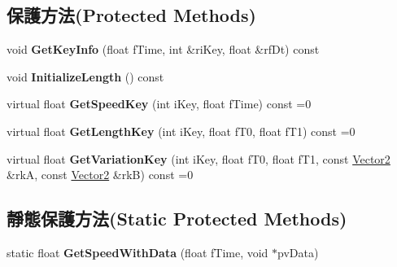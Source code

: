 \subsection*{保護方法(Protected Methods)}
\begin{DoxyCompactItemize}
\item 
void {\bfseries Get\+Key\+Info} (float f\+Time, int \&ri\+Key, float \&rf\+Dt) const \hypertarget{class_i_dream_sky_1_1_multiple_curve2_ad59c0b00aa2282786c3a580b8e47ae83}{}\label{class_i_dream_sky_1_1_multiple_curve2_ad59c0b00aa2282786c3a580b8e47ae83}

\item 
void {\bfseries Initialize\+Length} () const \hypertarget{class_i_dream_sky_1_1_multiple_curve2_a6835a1262bd04d50459f82568a1fb76a}{}\label{class_i_dream_sky_1_1_multiple_curve2_a6835a1262bd04d50459f82568a1fb76a}

\item 
virtual float {\bfseries Get\+Speed\+Key} (int i\+Key, float f\+Time) const  =0\hypertarget{class_i_dream_sky_1_1_multiple_curve2_a3d68ef520bf37227d12434ae1b231980}{}\label{class_i_dream_sky_1_1_multiple_curve2_a3d68ef520bf37227d12434ae1b231980}

\item 
virtual float {\bfseries Get\+Length\+Key} (int i\+Key, float f\+T0, float f\+T1) const  =0\hypertarget{class_i_dream_sky_1_1_multiple_curve2_a3112bc54fd6d6a085d801f6c85dfa8eb}{}\label{class_i_dream_sky_1_1_multiple_curve2_a3112bc54fd6d6a085d801f6c85dfa8eb}

\item 
virtual float {\bfseries Get\+Variation\+Key} (int i\+Key, float f\+T0, float f\+T1, const \hyperlink{class_i_dream_sky_1_1_vector2}{Vector2} \&rkA, const \hyperlink{class_i_dream_sky_1_1_vector2}{Vector2} \&rkB) const  =0\hypertarget{class_i_dream_sky_1_1_multiple_curve2_adb15a051dc417d34ad27efa7015e155d}{}\label{class_i_dream_sky_1_1_multiple_curve2_adb15a051dc417d34ad27efa7015e155d}

\end{DoxyCompactItemize}
\subsection*{靜態保護方法(Static Protected Methods)}
\begin{DoxyCompactItemize}
\item 
static float {\bfseries Get\+Speed\+With\+Data} (float f\+Time, void $\ast$pv\+Data)\hypertarget{class_i_dream_sky_1_1_multiple_curve2_aecbf532a608988d8ccbb2c65c2a9fe5f}{}\label{class_i_dream_sky_1_1_multiple_curve2_aecbf532a608988d8ccbb2c65c2a9fe5f}

\end{DoxyCompactItemize}
